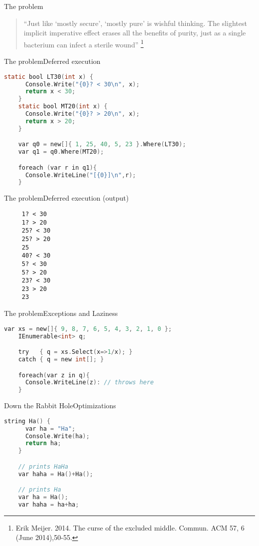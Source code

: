 \documentclass[rail]{beamer}
\begin{document}
\begin{frame}{The problem}
    \begin{quote}
    ``Just like `mostly secure', `mostly pure' is wishful
    thinking. The slightest implicit imperative effect erases all the
    benefits of purity, just as a single bacterium can infect a
    sterile wound''
    \footnote[frame,1] {Erik Meijer. 2014. The curse of the
      excluded middle. Commun. ACM 57, 6 (June 2014),50-55.}
  \end{quote}
\end{frame}


\begin{frame}[fragile]{The problem}{Deferred execution}
  \begin{lstlisting}[language=C]
    static bool LT30(int x) {
      Console.Write("{0}? < 30\n", x);
      return x < 30;
    }
    static bool MT20(int x) {
      Console.Write("{0}? > 20\n", x);
      return x > 20;
    }

    var q0 = new[]{ 1, 25, 40, 5, 23 }.Where(LT30);
    var q1 = q0.Where(MT20);

    foreach (var r in q1){
      Console.WriteLine("[{0}]\n",r);
    }
  \end{lstlisting}
\end{frame}

\begin{frame}[fragile]{The problem}{Deferred execution (output)}
\begin{verbatim}
     1? < 30
     1? > 20
     25? < 30
     25? > 20
     25
     40? < 30
     5? < 30
     5? > 20
     23? < 30
     23 > 20
     23
\end{verbatim}
\end{frame}

\begin{frame}[fragile]{The problem}{Exceptions and Laziness}
  \begin{lstlisting}[language=C]
    var xs = new[]{ 9, 8, 7, 6, 5, 4, 3, 2, 1, 0 };
    IEnumerable<int> q;

    try   { q = xs.Select(x=>1/x); }
    catch { q = new int[]; }

    foreach(var z in q){
      Console.WriteLine(z): // throws here
    }
  \end{lstlisting}
\end{frame}

\begin{frame}[fragile]{Down the Rabbit Hole}{Optimizations}
  \begin{lstlisting}[language=C]
    string Ha() {
      var ha = "Ha";
      Console.Write(ha);
      return ha;
    }

    // prints HaHa
    var haha = Ha()+Ha();

    // prints Ha
    var ha = Ha();
    var haha = ha+ha;
  \end{lstlisting}
\end{frame}
\end{document}
